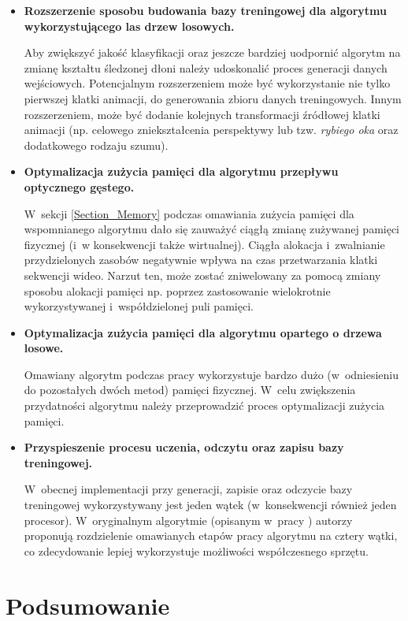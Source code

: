     \begin{itemize}
      \item \textbf{Rozszerzenie sposobu budowania bazy treningowej dla algorytmu wykorzystującego las drzew losowych.}

      Aby zwiększyć jakość klasyfikacji oraz jeszcze bardziej uodpornić algorytm na zmianę kształtu śledzonej dłoni należy udoskonalić proces generacji danych wejściowych. Potencjalnym rozszerzeniem może być wykorzystanie nie tylko pierwszej klatki animacji, do generowania zbioru danych treningowych. Innym rozszerzeniem, może być dodanie kolejnych transformacji źródłowej klatki animacji (np. celowego zniekształcenia perspektywy lub tzw. \textit{rybiego oka} oraz dodatkowego rodzaju szumu).

      \item \textbf{Optymalizacja zużycia pamięci dla algorytmu przepływu optycznego gęstego.}

      W~sekcji \ref{Section_Memory} podczas omawiania zużycia pamięci dla wspomnianego algorytmu dało się zauważyć ciągłą zmianę zużywanej pamięci fizycznej (i~w konsekwencji także wirtualnej). Ciągła alokacja i~zwalnianie przydzielonych zasobów negatywnie wpływa na czas przetwarzania klatki sekwencji wideo. Narzut ten, może zostać zniwelowany za pomocą zmiany sposobu alokacji pamięci np. poprzez zastosowanie wielokrotnie wykorzystywanej i~współdzielonej puli pamięci.

      \item \textbf{Optymalizacja zużycia pamięci dla algorytmu opartego o drzewa losowe.}

      Omawiany algorytm podczas pracy wykorzystuje bardzo dużo (w~odniesieniu do pozostałych dwóch metod) pamięci fizycznej. W~celu zwiększenia przydatności algorytmu należy przeprowadzić proces optymalizacji zużycia pamięci.

      \item \textbf{Przyspieszenie procesu uczenia, odczytu oraz zapisu bazy treningowej.}

       W~obecnej implementacji przy generacji, zapisie oraz odczycie bazy treningowej wykorzystywany jest jeden wątek (w~konsekwencji również jeden procesor). W~oryginalnym algorytmie (opisanym w~pracy \cite{RandomizedTrees06}) autorzy proponują rozdzielenie omawianych etapów pracy algorytmu na cztery wątki, co zdecydowanie lepiej wykorzystuje możliwości współczesnego sprzętu.
    \end{itemize}

\chapter{Podsumowanie}\label{Section_Podsumowanie}

